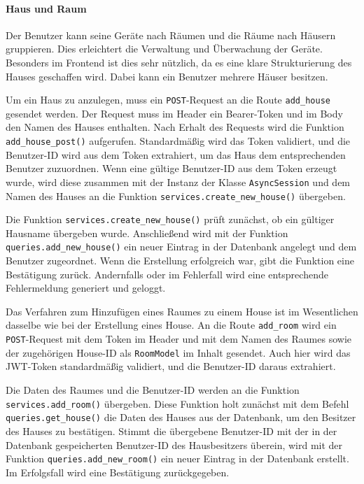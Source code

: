 \documentclass[12pt, letterpaper]{article}
\begin{document}
  \paragraph{Haus und Raum}
  \par \textbf{}
  \par Der Benutzer kann seine Geräte nach Räumen und die Räume nach Häusern gruppieren. Dies erleichtert die Verwaltung und Überwachung der Geräte. Besonders im Frontend ist dies sehr nützlich, da es eine klare Strukturierung des Hauses geschaffen wird. Dabei kann ein Benutzer mehrere Häuser besitzen.
  \par Um ein Haus zu anzulegen, muss ein \texttt{POST}-Request an die Route \texttt{add\_house} gesendet werden. Der Request muss im Header ein Bearer-Token und im Body den Namen des Hauses enthalten. Nach Erhalt des Requests wird die Funktion \texttt{add\_house\_post()} aufgerufen. Standardmäßig wird das Token validiert, und die Benutzer-ID wird aus dem Token extrahiert, um das Haus dem entsprechenden Benutzer zuzuordnen. Wenn eine gültige Benutzer-ID aus dem Token erzeugt wurde, wird diese zusammen mit der Instanz der Klasse \texttt{AsyncSession} und dem Namen des Hauses an die Funktion \texttt{services.create\_new\_house()} übergeben.
  \par Die Funktion \texttt{services.create\_new\_house()} prüft zunächst, ob ein gültiger Hausname übergeben wurde. Anschließend wird mit der Funktion \texttt{queries.add\_new\_house()} ein neuer Eintrag in der Datenbank angelegt und dem Benutzer zugeordnet. Wenn die Erstellung erfolgreich war, gibt die Funktion eine Bestätigung zurück. Andernfalls oder im Fehlerfall wird eine entsprechende Fehlermeldung generiert und geloggt.
  \par Das Verfahren zum Hinzufügen eines Raumes zu einem House ist im Wesentlichen dasselbe wie bei der Erstellung eines House. An die Route \texttt{add\_room} wird ein \texttt{POST}-Request mit dem Token im Header und mit dem Namen des Raumes sowie der zugehörigen House-ID als \texttt{RoomModel} im Inhalt gesendet. Auch hier wird das JWT-Token standardmäßig validiert, und die Benutzer-ID daraus extrahiert. 
  \par Die Daten des Raumes und die Benutzer-ID werden an die Funktion \texttt{services.add\_room()} übergeben. Diese Funktion holt zunächst mit dem Befehl \texttt{queries.get\_house()} die Daten des Hauses aus der Datenbank, um den Besitzer des Hauses zu bestätigen. Stimmt die übergebene Benutzer-ID mit der in der Datenbank gespeicherten Benutzer-ID des Hausbesitzers überein, wird mit der Funktion \texttt{queries.add\_new\_room()} ein neuer Eintrag in der Datenbank erstellt. Im Erfolgsfall wird eine Bestätigung zurückgegeben. 
\end{document}
